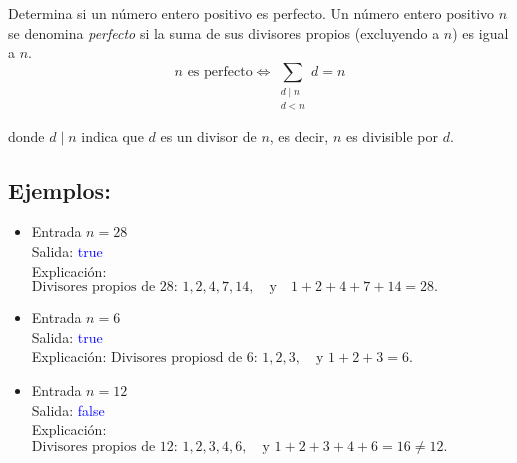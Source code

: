 Determina si un número entero positivo es perfecto. Un número entero positivo \( n \) se denomina \textit{perfecto} si la suma de sus divisores propios (excluyendo a \( n \)) es igual a \( n \).
\[
n \text{ es perfecto} \iff \sum_{\substack{d \mid n \\ d < n}} d = n
\]

donde \( d \mid n \) indica que \( d \) es un divisor de \( n \), es decir, \( n \) es divisible por \( d \). 

\subsection*{Ejemplos:}
\begin{itemize}
    \item Entrada \( n = 28 \)\\
    Salida: \textcolor{blue}{true}\\
    Explicación:
    \(
    \text{Divisores propios de 28: } 1, 2, 4, 7, 14, \quad \text{y} \quad 1 + 2 + 4 + 7 + 14 = 28.
    \)
    
    \item Entrada \( n = 6 \)\\
    Salida: \textcolor{blue}{true}\\
    Explicación:
    \(
    \text{Divisores propiosd de 6: } 1, 2, 3, \quad \text{y } 1 + 2 + 3 = 6.
    \)

    \item Entrada \( n = 12 \)\\
    Salida: \textcolor{blue}{false}\\
    Explicación:
    \(
    \text{Divisores propios de 12: } 1, 2, 3, 4, 6, \quad \text{y } 1 + 2 + 3 + 4 + 6 = 16 \neq 12.
    \)
\end{itemize}
